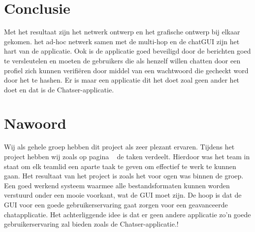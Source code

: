 \documentclass[12pt]{article}
\begin{document}
\section{Conclusie}
Met het resultaat zijn het netwerk ontwerp en het grafische ontwerp bij elkaar gekomen.  het ad-hoc netwerk samen met de multi-hop en de chatGUI zijn het hart van de applicatie.  Ook is de applicatie goed beveiligd door de berichten goed te versleutelen en moeten de gebruikers die als henzelf willen chatten door een profiel zich kunnen verifi\"eren door middel van een wachtwoord die gecheckt word door het te hashen. Er is maar een applicatie dit het doet zoal geen ander het doet en dat is de Chatser-applicatie\small\textcopyright.

\newpage

\section{Nawoord}
Wij als gehele groep hebben dit project als zeer plezant ervaren. Tijdens het project hebben wij zoals op pagina ~\pageref{taken} de taken verdeelt. Hierdoor was het team in staat om elk teamlid een aparte taak te geven om effectief te werk te kunnen gaan. Het resultaat van het project is zoals het voor ogen was binnen de groep. Een goed werkend systeem waarmee alle bestandsformaten kunnen  worden verstuurd onder een mooie voorkant, wat de GUI moet zijn. De hoop is dat de GUI voor een goede gebruikerservaring gaat zorgen voor een geavanceerde chatapplicatie. Het achterliggende idee is dat er geen andere applicatie zo'n goede gebruikerservaring zal bieden zoals de Chatser-applicatie\small.\textcopyright!

\newpage



\end{document}
